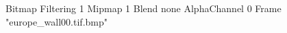 {Bitmap
	{Filtering 1}
	{Mipmap 1}
	{Blend none}
	{AlphaChannel 0}
	{Frame "europe_wall00.tif.bmp"}
}
